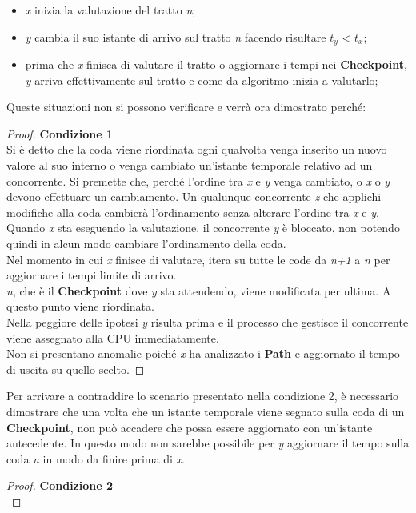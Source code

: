 \begin{itemize}
\begin{itemize}
\item \emph{x} inizia la valutazione del tratto \emph{n};
\item \emph{y} cambia il suo istante di arrivo sul tratto \emph{n} facendo risultare $t_y$ < $t_x$;
\item prima che \emph{x} finisca di valutare il tratto o aggiornare i tempi nei \textbf{Checkpoint}, \emph{y} arriva effettivamente sul 
tratto e come da algoritmo inizia a valutarlo;
\end{itemize}
Queste situazioni non si possono verificare e verrà ora dimostrato perché:
\begin{proof} \textbf{Condizione 1}\\
Si è detto che la coda viene riordinata ogni qualvolta venga inserito un nuovo valore al suo interno o venga cambiato un'istante temporale
relativo ad un concorrente. Si premette che, perché l'ordine tra \emph{x} e \emph{y} venga cambiato, o \emph{x} o \emph{y} devono effettuare
un cambiamento. Un qualunque concorrente \emph{z} che applichi modifiche alla coda cambierà l'ordinamento senza alterare l'ordine tra \emph{x}
e \emph{y}.\\
Quando \emph{x} sta eseguendo la valutazione, il concorrente \emph{y} è bloccato, non potendo quindi in alcun modo cambiare l'ordinamento della 
coda.\\ 
Nel momento in cui \emph{x} finisce di valutare, itera su tutte le code da \emph{n+1} a \emph{n} per aggiornare i tempi limite di arrivo.\\
\emph{n}, che è il \textbf{Checkpoint} dove \emph{y} sta attendendo, viene modificata per ultima. A questo punto viene riordinata.\\
Nella peggiore delle ipotesi \emph{y} risulta prima e il processo che gestisce il concorrente viene assegnato alla CPU immediatamente.\\
Non si presentano anomalie poiché \emph{x} ha analizzato i \textbf{Path} e aggiornato il tempo di uscita su quello scelto. %
\end{proof}
Per arrivare a contraddire lo scenario presentato nella condizione 2, è necessario dimostrare che una volta che un istante temporale
viene segnato sulla coda di un \textbf{Checkpoint}, non può accadere che possa essere aggiornato con un'istante antecedente. In questo modo
non sarebbe possibile per \emph{y} aggiornare il tempo sulla coda \emph{n} in modo da finire prima di \emph{x}.
\begin{proof} \textbf{Condizione 2}\\

\end{proof}
\end{itemize}
